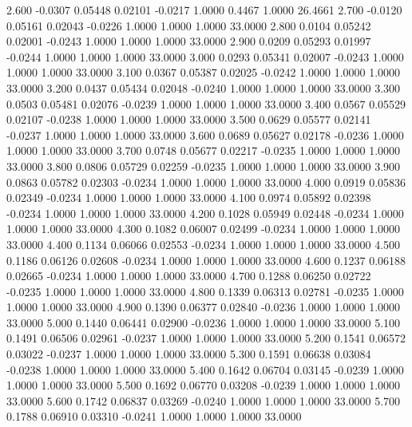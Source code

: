    2.600  -0.0307   0.05448   0.02101  -0.0217   1.0000   0.4467   1.0000  26.4661
   2.700  -0.0120   0.05161   0.02043  -0.0226   1.0000   1.0000   1.0000  33.0000
   2.800   0.0104   0.05242   0.02001  -0.0243   1.0000   1.0000   1.0000  33.0000
   2.900   0.0209   0.05293   0.01997  -0.0244   1.0000   1.0000   1.0000  33.0000
   3.000   0.0293   0.05341   0.02007  -0.0243   1.0000   1.0000   1.0000  33.0000
   3.100   0.0367   0.05387   0.02025  -0.0242   1.0000   1.0000   1.0000  33.0000
   3.200   0.0437   0.05434   0.02048  -0.0240   1.0000   1.0000   1.0000  33.0000
   3.300   0.0503   0.05481   0.02076  -0.0239   1.0000   1.0000   1.0000  33.0000
   3.400   0.0567   0.05529   0.02107  -0.0238   1.0000   1.0000   1.0000  33.0000
   3.500   0.0629   0.05577   0.02141  -0.0237   1.0000   1.0000   1.0000  33.0000
   3.600   0.0689   0.05627   0.02178  -0.0236   1.0000   1.0000   1.0000  33.0000
   3.700   0.0748   0.05677   0.02217  -0.0235   1.0000   1.0000   1.0000  33.0000
   3.800   0.0806   0.05729   0.02259  -0.0235   1.0000   1.0000   1.0000  33.0000
   3.900   0.0863   0.05782   0.02303  -0.0234   1.0000   1.0000   1.0000  33.0000
   4.000   0.0919   0.05836   0.02349  -0.0234   1.0000   1.0000   1.0000  33.0000
   4.100   0.0974   0.05892   0.02398  -0.0234   1.0000   1.0000   1.0000  33.0000
   4.200   0.1028   0.05949   0.02448  -0.0234   1.0000   1.0000   1.0000  33.0000
   4.300   0.1082   0.06007   0.02499  -0.0234   1.0000   1.0000   1.0000  33.0000
   4.400   0.1134   0.06066   0.02553  -0.0234   1.0000   1.0000   1.0000  33.0000
   4.500   0.1186   0.06126   0.02608  -0.0234   1.0000   1.0000   1.0000  33.0000
   4.600   0.1237   0.06188   0.02665  -0.0234   1.0000   1.0000   1.0000  33.0000
   4.700   0.1288   0.06250   0.02722  -0.0235   1.0000   1.0000   1.0000  33.0000
   4.800   0.1339   0.06313   0.02781  -0.0235   1.0000   1.0000   1.0000  33.0000
   4.900   0.1390   0.06377   0.02840  -0.0236   1.0000   1.0000   1.0000  33.0000
   5.000   0.1440   0.06441   0.02900  -0.0236   1.0000   1.0000   1.0000  33.0000
   5.100   0.1491   0.06506   0.02961  -0.0237   1.0000   1.0000   1.0000  33.0000
   5.200   0.1541   0.06572   0.03022  -0.0237   1.0000   1.0000   1.0000  33.0000
   5.300   0.1591   0.06638   0.03084  -0.0238   1.0000   1.0000   1.0000  33.0000
   5.400   0.1642   0.06704   0.03145  -0.0239   1.0000   1.0000   1.0000  33.0000
   5.500   0.1692   0.06770   0.03208  -0.0239   1.0000   1.0000   1.0000  33.0000
   5.600   0.1742   0.06837   0.03269  -0.0240   1.0000   1.0000   1.0000  33.0000
   5.700   0.1788   0.06910   0.03310  -0.0241   1.0000   1.0000   1.0000  33.0000
